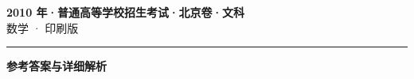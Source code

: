 \documentclass[zihao=5, a4paper]{ctexart}
\begin{document}
\begin{center}
  {\Large\bfseries 2010 年·普通高等学校招生考试·北京卷·文科}\\[4pt]
  {\large 数学 · 印刷版}
\end{center}
\medskip
{}

\par\bigskip\hrule\bigskip
{}
\begin{center}{\large\bfseries 参考答案与详细解析}\end{center}
\smallskip

\end{document}
